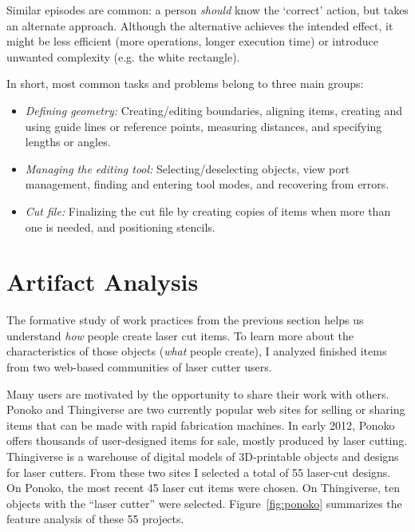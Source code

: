 Similar episodes are common: a person \textit{should} know the
`correct' action, but takes an alternate approach. Although the
alternative achieves the intended effect, it might be less efficient
(more operations, longer execution time) or introduce unwanted
complexity (e.g. the white rectangle).

\begin{samepage}
In short, most common tasks and problems belong to three main groups:

\begin{itemize}
\item \textit{Defining geometry:} Creating/editing boundaries,
  aligning items, creating and using guide lines or reference points,
  measuring distances, and specifying lengths or angles.
\item \textit{Managing the editing tool:} Selecting/deselecting
  objects, view port management, finding and entering tool modes, and
  recovering from errors.
\item \textit{Cut file:} Finalizing the cut file by creating copies of
  items when more than one is needed, and positioning stencils.
\end{itemize}
\end{samepage}

\section{Artifact Analysis}
\label{sec:formative-artifact}

The formative study of work practices from the previous section helps
us understand \textit{how} people create laser cut items. To learn
more about the characteristics of those objects (\textit{what} people
create), I analyzed finished items from two web-based communities of
laser cutter users.

Many users are motivated by the opportunity to share their work with
others. Ponoko and Thingiverse are two currently popular web sites for
selling or sharing items that can be made with rapid fabrication
machines. In early 2012, Ponoko offers thousands of user-designed
items for sale, mostly produced by laser cutting. Thingiverse is a
warehouse of digital models of 3D-printable objects and designs for
laser cutters. From these two sites I selected a total of 55 laser-cut
designs. On Ponoko, the most recent 45 laser cut items were chosen.
On Thingiverse, ten objects with the ``laser cutter'' were
selected. Figure~\ref{fig:ponoko} summarizes the feature analysis of
these 55 projects.

